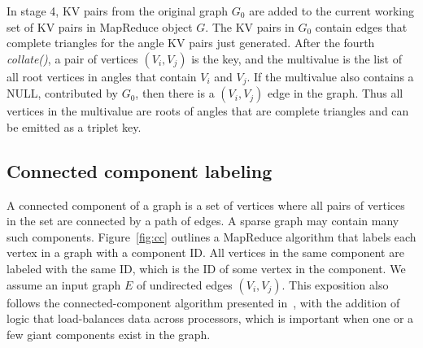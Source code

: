 In stage 4, KV pairs from the original graph $G_0$ are added to the
current working set of KV pairs in MapReduce object $G$.  The KV pairs
in $G_0$ contain edges that complete triangles for the angle KV pairs
just generated.  After the fourth {\it collate()}, a pair of vertices
$(V_i,V_j)$ is the key, and the multivalue is the list of all root
vertices in angles that contain $V_i$ and $V_j$.  If the multivalue
also contains a NULL, contributed by $G_0$, then there is a
$(V_i,V_j)$ edge in the graph.  Thus all vertices in the multivalue
are roots of angles that are complete triangles and can be emitted as
a triplet key.

\subsection{Connected component labeling}

A connected component of a graph is a set of vertices where all pairs
of vertices in the set are connected by a path of edges.  A sparse
graph may contain many such components.  Figure~\ref{fig:cc} outlines
a MapReduce algorithm that labels each vertex in a graph with a
component ID.  All vertices in the same component are labeled with
the same ID, which is the ID of some vertex in the component.  We
assume an input graph $E$ of undirected edges $(V_i,V_j)$.  This
exposition also follows the connected-component algorithm presented
in~\cite{Cohen09}, with the addition of logic that load-balances data
across processors, which is important when one or a few giant
components exist in the graph.

